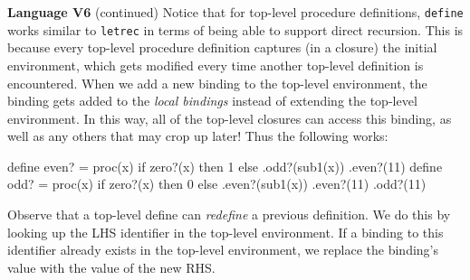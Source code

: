 \begin{minipage}[t]{\sw}
\slidenumber
\LARGE
{\bf Language V6} (continued)\exx
Notice that for top-level procedure definitions,
\verb'define' works similar to \verb'letrec'
in terms of being able to support direct recursion.
This is because every top-level procedure definition captures
(in a closure) the initial environment,
which gets modified every time another top-level definition is encountered.
When we add a new binding to the top-level environment,
the binding gets added to the {\em local bindings}
instead of extending the top-level environment.
In this way, all of the top-level closures can access this binding,
as well as any others that may crop up later!
Thus the following works:
\begin{qv}
define even? = proc(x)
  if zero?(x) then 1 else .odd?(sub1(x))
.even?(11) %
define odd? = proc(x)
  if zero?(x) then 0 else .even?(sub1(x))
.even?(11) %
.odd?(11)  %
\end{qv}
\LARGE
Observe that a top-level define can {\em redefine} a previous definition.
We do this by looking up the LHS identifier in the top-level environment.
If a binding to this identifier already exists in the top-level environment,
we replace the binding's value with the value of the new RHS.
\end{minipage}
\clearpage
